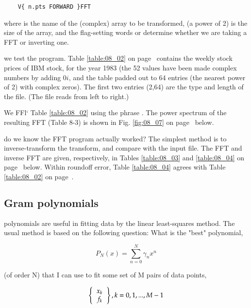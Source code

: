 \begin{lstlisting}
    V{ n.pts FORWARD }FFT
\end{lstlisting}

where  is the name of the (complex) array to be transformed,  (a power of 2) is the size of the array, and the flag-setting words  or  determine whether we are taking a FFT or inverting one.

 we test the program. Table \ref{table:08_02} on page~\pageref{table:08_02} contains the weekly stock prices of IBM stock, for the year 1983 (the 52 values have been made complex numbers by adding $0i$, and the table padded out to 64 entries (the nearest power of 2) with complex zeros). The first two entries (2,64) are the type and length of the file. (The file reads from left to right.)

We FFl‘ Table \ref{table:08_02} using the phrase . The power spectrum of the resulting FFT (Table 8-3) is shown in Fig. \ref{fig:08_07} on page~\pageref{fig:08_07} below.



 do we know the FFT program actually worked? The simplest method is to inverse-transform the transform, and compare with the input file. The FFT and inverse FFT are given, respectively, in Tables \ref{table:08_03} and \ref{table:08_04} on page~\pageref{table:08_02} below. Within roundoff error, Table \ref{table:08_04} agrees with Table \ref{table:08_02} on page~\pageref{table:08_02}.

    
    
    
    

\subsection{Gram polynomials}
 polynomials are useful in fitting data by the linear least-squares method. The usual method is based on the following question: What is the "best" polynomial,

\begin{equation}
P_N(x) = \sum_{n=0}^N \gamma_n x^n
\end{equation}

(of order N) that I can use to fit some set of M pairs of data points,

\begin{equation*}
    \left \{
      \begin{tabular}{c}
      $x_{k}$ \\
      $f_{k}$
      \end{tabular}
    \right \}
    , k=0,1, ... , M-1
\end{equation*}

